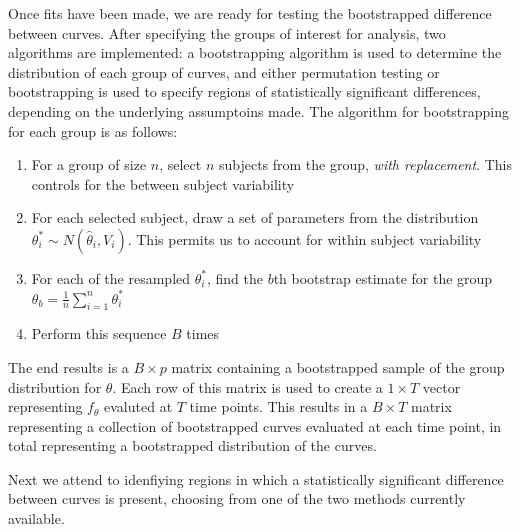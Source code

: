 \documentclass{article}
\begin{document}
Once fits have been made, we are ready for testing the bootstrapped difference between curves. After specifying the groups of interest for analysis, two algorithms are implemented: a bootstrapping algorithm is used to determine the distribution of each group of curves, and either permutation testing or bootstrapping is used to specify regions of statistically significant differences, depending on the underlying assumptoins made. The algorithm for  bootstrapping for each group is as follows:

\begin{enumerate}
\item For a group of size $n$, select $n$ subjects from the group, \textit{with replacement}. This controls for the between subject variability
\item For each selected subject, draw a set of parameters from the distribution $\theta_{i}^* \sim N(\hat{\theta}_i, V_i)$. This permits us to account for within subject variability
\item For each of the resampled $\theta_i^*$, find the $b$th bootstrap estimate for the group $\theta_b = \frac1n \sum_{i=1}^n \theta_i^*$
\item Perform this sequence $B$ times
\end{enumerate}


The end results is a $B \times p$ matrix containing a bootstrapped sample of the group distribution for $\theta$. Each row of this matrix is used to create a $1 \times T$ vector representing $f_{\theta}$ evaluted at $T$ time points. This results in a $B \times T$ matrix representing a collection of bootstrapped curves evaluated at each time point, in total representing a bootstrapped distribution of the curves.



Next we attend to idenfiying regions in which a statistically significant difference between curves is present, choosing from one of the two methods currently available.
\end{document}
